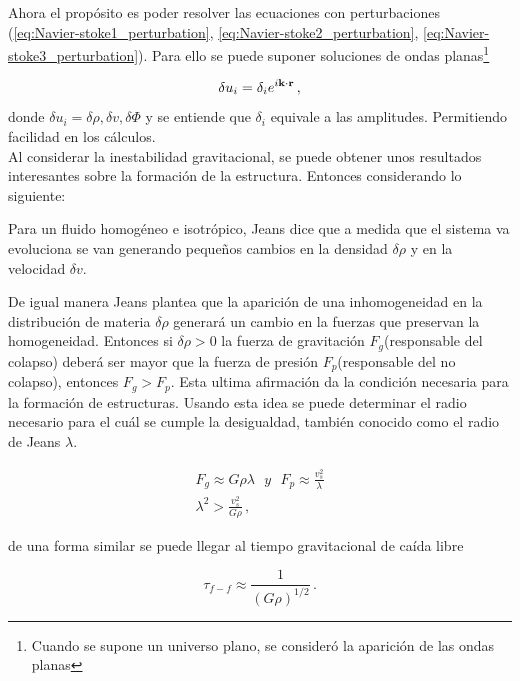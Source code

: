 Ahora el propósito es poder resolver las ecuaciones con perturbaciones (\ref{eq:Navier-stoke1_perturbation}, \ref{eq:Navier-stoke2_perturbation}, \ref{eq:Navier-stoke3_perturbation}). Para ello  se puede suponer soluciones de ondas planas\footnote{Cuando se supone un universo plano, se consideró la aparición de las ondas planas}

\begin{equation}
\delta u_{i} = \delta_{i}e^{i\bf{k}\cdot \bf{r}}\,,
\end{equation}
%
donde $\delta u_{i}= \delta\rho, \delta v, \delta\Phi$ y se entiende que $\delta_{i}$ equivale a las amplitudes. Permitiendo facilidad en los cálculos. 
~\\
Al considerar la inestabilidad gravitacional, se puede obtener unos resultados  interesantes sobre la formación de la estructura. Entonces considerando lo siguiente: 

Para un fluido homogéneo e isotrópico, Jeans dice que a medida que el sistema va evoluciona se van generando pequeños cambios en la densidad $\delta \rho$ y en la velocidad $\delta v$.

De igual manera Jeans plantea que la aparición de una inhomogeneidad en la distribución de materia $\delta\rho$  generará un cambio en la fuerzas que preservan la homogeneidad. Entonces si $\delta\rho>0 $  la fuerza de gravitación $F_{g}$(responsable del colapso) deberá ser mayor que la fuerza de presión $F_{p}$(responsable del no colapso), entonces   $F_{g}>F_{p}$. Esta ultima afirmación da la condición necesaria para la formación de estructuras. Usando esta idea se puede determinar el radio necesario para el cuál se cumple la desigualdad, también conocido como el radio de Jeans $\lambda$.  

\begin{eqnarray}
F_{g} \approx G\rho\lambda \ \ \  y \ \ \ F_{p}\approx\frac{v_{s}^{2}}{\lambda}\\
\lambda^{2} > \frac{v_{s}^{2}}{G\rho} \,,
\end{eqnarray}

de una forma similar se puede llegar al tiempo gravitacional de caída libre 

\begin{equation}
\tau_{f-f} \approx \frac{1}{(G\rho)^{1/2}}\,.
\end{equation}


